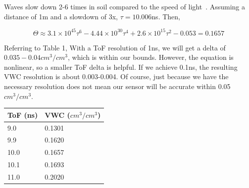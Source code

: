 \documentclass[12pt]{article}
\begin{document}
Waves slow down 2-6 times in soil compared to the speed of
light~\cite{gpr}. Assuming a distance of 1m and a slowdown of 3x,
$\tau = 10.006$ns. Then,

\begin{equation}
  \Theta \approx 3.1\times 10^{45}\tau^6-4.44\times 10^{30}\tau^4+2.6\times 10^{15}\tau^2-0.053 = 0.1657
\end{equation}

Referring to Table 1, With a ToF resolution of 1ns, we will get a
delta of $0.035-0.04 cm^3/cm^3$, which is within our bounds. However,
the equation is nonlinear, so a smaller ToF delta is helpful. If we
achieve 0.1ns, the resulting VWC resolution is about 0.003-0.004. Of
course, just because we have the necessary resolution does not mean
our sensor will be accurate within 0.05$cm^3/cm^3$.


\begin{table}[]
  \centering
\begin{tabular}{l|l}
\textbf{ToF (ns)} & \textbf{VWC ($cm^3/cm^3$)} \\ \hline
9.0               & 0.1301                                                      \\
9.9              & 0.1620                                                       \\
  10.0              & 0.1657                                                       \\
10.1              & 0.1693                                                       \\
11.0              & 0.2020                                                      
\end{tabular}
\end{table}
\end{document}
